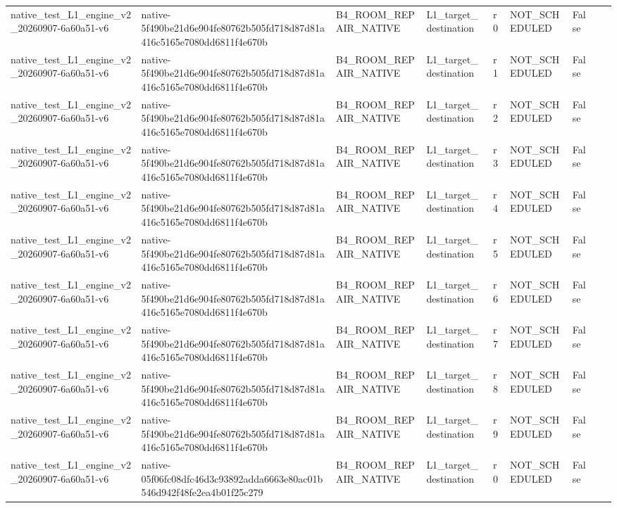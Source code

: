 \begin{tabular}{lllllllll}
native\_test\_L1\_engine\_v2\_20260907-6a60a51-v6 & native-5f490be21d6e904fe80762b505fd718d87d81a416c5165e7080dd6811f4e670b & B4\_ROOM\_REPAIR\_NATIVE & L1\_target\_destination & r0 & NOT\_SCHEDULED & False &  &  \\
native\_test\_L1\_engine\_v2\_20260907-6a60a51-v6 & native-5f490be21d6e904fe80762b505fd718d87d81a416c5165e7080dd6811f4e670b & B4\_ROOM\_REPAIR\_NATIVE & L1\_target\_destination & r1 & NOT\_SCHEDULED & False &  &  \\
native\_test\_L1\_engine\_v2\_20260907-6a60a51-v6 & native-5f490be21d6e904fe80762b505fd718d87d81a416c5165e7080dd6811f4e670b & B4\_ROOM\_REPAIR\_NATIVE & L1\_target\_destination & r2 & NOT\_SCHEDULED & False &  &  \\
native\_test\_L1\_engine\_v2\_20260907-6a60a51-v6 & native-5f490be21d6e904fe80762b505fd718d87d81a416c5165e7080dd6811f4e670b & B4\_ROOM\_REPAIR\_NATIVE & L1\_target\_destination & r3 & NOT\_SCHEDULED & False &  &  \\
native\_test\_L1\_engine\_v2\_20260907-6a60a51-v6 & native-5f490be21d6e904fe80762b505fd718d87d81a416c5165e7080dd6811f4e670b & B4\_ROOM\_REPAIR\_NATIVE & L1\_target\_destination & r4 & NOT\_SCHEDULED & False &  &  \\
native\_test\_L1\_engine\_v2\_20260907-6a60a51-v6 & native-5f490be21d6e904fe80762b505fd718d87d81a416c5165e7080dd6811f4e670b & B4\_ROOM\_REPAIR\_NATIVE & L1\_target\_destination & r5 & NOT\_SCHEDULED & False &  &  \\
native\_test\_L1\_engine\_v2\_20260907-6a60a51-v6 & native-5f490be21d6e904fe80762b505fd718d87d81a416c5165e7080dd6811f4e670b & B4\_ROOM\_REPAIR\_NATIVE & L1\_target\_destination & r6 & NOT\_SCHEDULED & False &  &  \\
native\_test\_L1\_engine\_v2\_20260907-6a60a51-v6 & native-5f490be21d6e904fe80762b505fd718d87d81a416c5165e7080dd6811f4e670b & B4\_ROOM\_REPAIR\_NATIVE & L1\_target\_destination & r7 & NOT\_SCHEDULED & False &  &  \\
native\_test\_L1\_engine\_v2\_20260907-6a60a51-v6 & native-5f490be21d6e904fe80762b505fd718d87d81a416c5165e7080dd6811f4e670b & B4\_ROOM\_REPAIR\_NATIVE & L1\_target\_destination & r8 & NOT\_SCHEDULED & False &  &  \\
native\_test\_L1\_engine\_v2\_20260907-6a60a51-v6 & native-5f490be21d6e904fe80762b505fd718d87d81a416c5165e7080dd6811f4e670b & B4\_ROOM\_REPAIR\_NATIVE & L1\_target\_destination & r9 & NOT\_SCHEDULED & False &  &  \\
native\_test\_L1\_engine\_v2\_20260907-6a60a51-v6 & native-05f06fc08dfc46d3c93892adda6663e80ac01b546d942f48fe2ea4b01f25c279 & B4\_ROOM\_REPAIR\_NATIVE & L1\_target\_destination & r0 & NOT\_SCHEDULED & False &  &  \\

\end{tabular}
